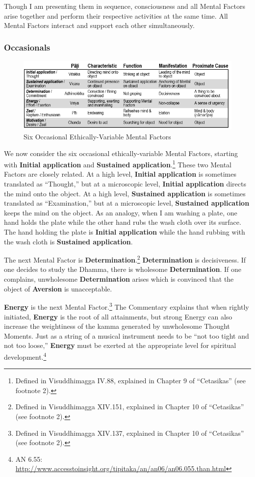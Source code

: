 Though I am presenting them in sequence, consciousness and all Mental Factors arise together and perform their respective activities at the same time. All Mental Factors interact and support each other simultaneously.

\subsubsection*{Occasionals}

\begin{figure}[h]
\centering
\includegraphics[width=0.8\linewidth]{./Diagrams/O-E}
\caption{Six Occasional Ethically-Variable Mental Factors}
\label{fig:O-E}
\end{figure}

We now consider the six occasional ethically-variable Mental Factors, starting with \textbf{Initial application} and \textbf{Sustained application}.\footnote{Defined in Visuddhimagga IV.88, explained in Chapter 9 of “Cetasikas” (see footnote 2).} These two Mental Factors are closely related. At a high level, \textbf{Initial application} is sometimes translated as “Thought,” but at a microscopic level, \textbf{Initial application} directs the mind onto the object. At a high level, \textbf{Sustained application} is sometimes translated as “Examination,” but at a microscopic level, \textbf{Sustained application} keeps the mind on the object. As an analogy, when I am washing a plate, one hand holds the plate while the other hand rubs the wash cloth over its surface. The hand holding the plate is \textbf{Initial application} while the hand rubbing with the wash cloth is \textbf{Sustained application}.

The next Mental Factor is \textbf{Determination}.\footnote{Defined in Visuddhimagga XIV.151, explained in Chapter 10 of “Cetasikas” (see footnote 2).} \textbf{Determination} is decisiveness. If one decides to study the Dhamma, there is wholesome \textbf{Determination}. If one complains, unwholesome \textbf{Determination} arises which is convinced that the object of \textbf{Aversion} is unacceptable.

\textbf{Energy} is the next Mental Factor.\footnote{Defined in Visuddhimagga XIV.137, explained in Chapter 10 of “Cetasikas” (see footnote 2).} The Commentary explains that when rightly initiated, \textbf{Energy} is the root of all attainments, but strong Energy can also increase the weightiness of the kamma generated by unwholesome Thought Moments. Just as a string of a musical instrument needs to be “not too tight and not too loose,” \textbf{Energy} must be exerted at the appropriate level for spiritual development.\footnote{AN 6.55: \url{http://www.accesstoinsight.org/tipitaka/an/an06/an06.055.than.html}}

